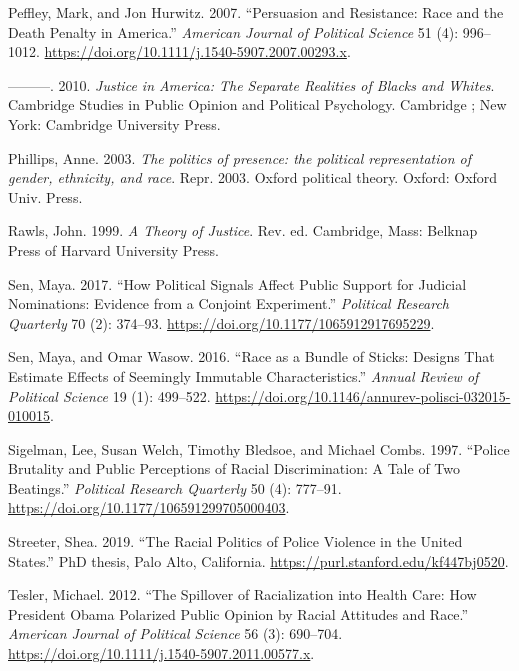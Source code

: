 \documentclass[
  12pt,
]{article}
\newlength{\cslhangindent}
\newlength{\cslentryspacingunit} %
\newenvironment{CSLReferences}[2] %
 {%
  \setlength{\parindent}{0pt}
  \ifodd #1
  \let\oldpar\par
  \def\par{\hangindent=\cslhangindent\oldpar}
  \fi
  \setlength{\parskip}{#2\cslentryspacingunit}
 }%
 {}
\begin{document}
\begin{CSLReferences}{1}{0}
\leavevmode{}%
Peffley, Mark, and Jon Hurwitz. 2007. {``Persuasion and Resistance: Race
and the Death Penalty in America.''} \emph{American Journal of Political
Science} 51 (4): 996--1012.
\url{https://doi.org/10.1111/j.1540-5907.2007.00293.x}.

\leavevmode{}%
---------. 2010. \emph{Justice in America: The Separate Realities of
Blacks and Whites}. Cambridge Studies in Public Opinion and Political
Psychology. Cambridge ; New York: Cambridge University Press.

\leavevmode{}%
Phillips, Anne. 2003. \emph{The politics of presence: the political
representation of gender, ethnicity, and race}. Repr. 2003. Oxford
political theory. Oxford: Oxford Univ. Press.

\leavevmode{}%
Rawls, John. 1999. \emph{A Theory of Justice}. Rev. ed. Cambridge, Mass:
Belknap Press of Harvard University Press.

\leavevmode{}%
Sen, Maya. 2017. {``How Political Signals Affect Public Support for
Judicial Nominations: Evidence from a Conjoint Experiment.''}
\emph{Political Research Quarterly} 70 (2): 374--93.
\url{https://doi.org/10.1177/1065912917695229}.

\leavevmode{}%
Sen, Maya, and Omar Wasow. 2016. {``Race as a Bundle of Sticks: Designs
That Estimate Effects of Seemingly Immutable Characteristics.''}
\emph{Annual Review of Political Science} 19 (1): 499--522.
\url{https://doi.org/10.1146/annurev-polisci-032015-010015}.

\leavevmode{}%
Sigelman, Lee, Susan Welch, Timothy Bledsoe, and Michael Combs. 1997.
{``Police Brutality and Public Perceptions of Racial Discrimination: A
Tale of Two Beatings.''} \emph{Political Research Quarterly} 50 (4):
777--91. \url{https://doi.org/10.1177/106591299705000403}.

\leavevmode{}%
Streeter, Shea. 2019. {``The Racial Politics of Police Violence in the
United States.''} PhD thesis, Palo Alto, California.
\url{https://purl.stanford.edu/kf447bj0520}.

\leavevmode{}%
Tesler, Michael. 2012. {``The Spillover of Racialization into Health
Care: How President Obama Polarized Public Opinion by Racial Attitudes
and Race.''} \emph{American Journal of Political Science} 56 (3):
690--704. \url{https://doi.org/10.1111/j.1540-5907.2011.00577.x}.


\end{CSLReferences}
\end{document}

